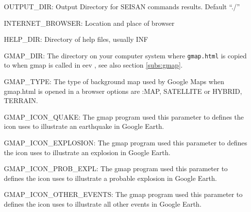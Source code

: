 OUTPUT\_DIR: Output Directory for SEISAN commands results. Default ``./''

%
%
%
%
%
%
%

INTERNET\_BROWSER: Location and place of browser 

HELP\_DIR: Directory of help files, usually INF 

\label{ref:gmap.par}
GMAP\_DIR: The directory on your computer system where \texttt{gmap.html} is copied to when gmap is 
called in eev , see also section \ref{subs:gmap}. 

GMAP\_TYPE: The type of background map used by Google Maps when gmap.html is 
opened in a browser options are :MAP, SATELLITE or HYBRID, TERRAIN. 


GMAP\_ICON\_QUAKE: The gmap program used this parameter to defines the icon uses to illustrate 
an earthquake in Google Earth. 

GMAP\_ICON\_EXPLOSION: The gmap program used this parameter to defines 
the icon uses to illustrate an explosion in Google Earth. 

GMAP\_ICON\_PROB\_EXPL: The gmap program used this parameter to defines the icon uses to 
illustrate a probable explosion in Google Earth. 

GMAP\_ICON\_OTHER\_EVENTS: The gmap program used this parameter to defines 
the icon uses to illustrate all other events in Google Earth. 

